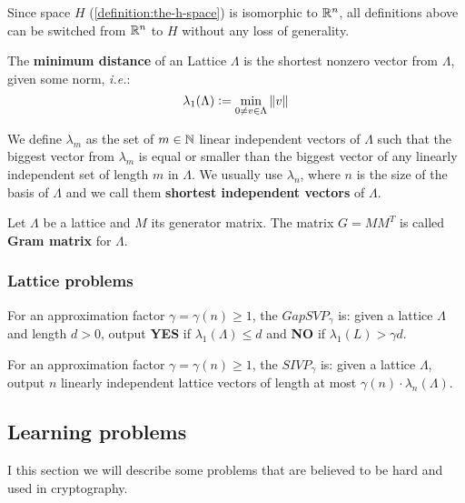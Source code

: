 \documentclass[a4paper,12pt]{article}
\begin{document}
Since space \(H\) (\ref{definition:the-h-space}) is isomorphic to \(\mathbb{R}^n\), all definitions above can be switched from \(\mathbb{R}^n\) to \(H\) without any loss of generality.

\begin{definition}
  The \textbf{minimum distance} of an Lattice $\Lambda$ is the shortest nonzero vector
  from $\Lambda$, given some norm, \textit{i.e.}:
  $$
  \lambda_1(\Lambda) \vcentcolon = \min_{0 \ne v \in \Lambda}{\|v\|}
  $$

  We define $\lambda_m$ as the set of $m \in \mathbb{N}$  linear independent vectors of $\Lambda$
  such that the biggest vector from $\lambda_m$ is equal or smaller than the biggest vector of any linearly independent set of length $m$ in $\Lambda$. We usually use
  $\lambda_n$, where $n$ is the size of the basis of $\Lambda$ and we call them
  \textbf{shortest independent vectors} of $\Lambda$.
\end{definition}

\begin{definition}\label{definition:gram-matrix}
  Let $\Lambda$ be a lattice and $M$ its generator matrix. The matrix $G = MM^T$ is called \textbf{Gram matrix} for $\Lambda$.
\end{definition}
\subsubsection{Lattice problems}
\label{sec:org85569c5}
\begin{definition}
  \label{definition:GapSVP-gap-shortest-vector-problem}
For an approximation factor $\gamma  = \gamma(n) \geq 1$, the $GapSVP_\gamma $ is: given a lattice
$\Lambda$ and length $d > 0$, output \textbf{YES} if $\lambda_1(\Lambda) \leq d$ and \textbf{NO} if
$\lambda_1(L) > \gamma d$.  
\end{definition}

\begin{definition}
  \label{definition:SIVP-shortest-independent-vector-problem}
  For an approximation factor $\gamma = \gamma(n) \geq 1$, the $SIVP_\gamma$ is: given a lattice $\Lambda$, output $n$ linearly independent lattice vectors of length at most $\gamma(n) \cdot \lambda_n(\Lambda)$.
\end{definition}

\subsection{Learning problems}
\label{sec:orgc71346d}
I this section we will describe some problems that are believed to be hard and used in cryptography. 
\end{document}
